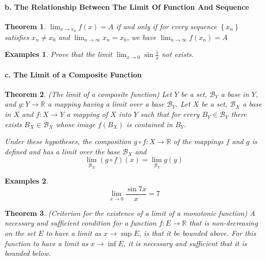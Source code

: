 \documentclass[a4paper,12pt]{article} %
\newtheorem{theorem}{Theorem}[section]
\newtheorem{example}{Examples}
\begin{document}
\paragraph{{\rm \textbf{b. The Relationship Between The Limit Of Function 
And Sequence}}}
\begin{theorem}
     $\displaystyle \lim_{x\to x_0} f(x) = A$ if and only if for every sequence 
     $\left\{x_n\right\}$ satisfies $x_n \ne x_0$ and $\displaystyle \lim_{n \to \infty}
     x_n = x_0$, we have $\displaystyle \lim_{n \to \infty} f(x_n) = A$
\end{theorem}

\begin{example}
    Prove that the limit $\displaystyle \lim_{x \to 0} \sin \frac{1}{x}$ not exists.
\end{example}

\paragraph{{\rm \textbf{c. The Limit of a Composite Function}}}
\begin{theorem}{(The limit of a composite function)}
    Let $Y$ be a set, $\mathcal{B}_Y$ a base in $Y$, and $g: Y \to \mathbb{R}$ 
    a mapping having a limit over a base $\mathcal{B}_Y$. Let $X$ be a set,
    $\mathcal{B}_X$ a base in $X$ and $f: X \to Y$ a mapping of $X$ into $Y$
    such that for every $B_Y \in \mathcal{B}_Y$ there exists $B_X \in \mathcal{B}_X$ 
    whose image $f(B_X)$ is contained in $B_Y$.

    Under these hypotheses, the composition $g \circ f: X \to \mathbb{R}$ of the 
    mappings $f$ and $g$  is defined and has a limit over the base $\mathcal{B}_X$
    and 
    \[
        \lim_{\mathcal{B}_X}(g\circ f)(x) = \lim_{\mathcal{B}_Y}g(y)
    \]
\end{theorem}

\begin{example}
    \[
    \lim_{x \to 0}\frac{\sin 7x}{x} = 7
    \]
\end{example}

\begin{theorem}{(Criterion for the existence of a limit of a monotonic function)}
    A necessary and sufficient condition for a function $f: E \to \mathbb{R}$
    that is non-decreasing on the set $E$ to have a limit as $x \to \sup E$,
    is that it be bounded above. For this function to have a limit as 
    $x \to \inf E$, it is necessary and sufficient that it is bounded below.
\end{theorem}
\end{document}
